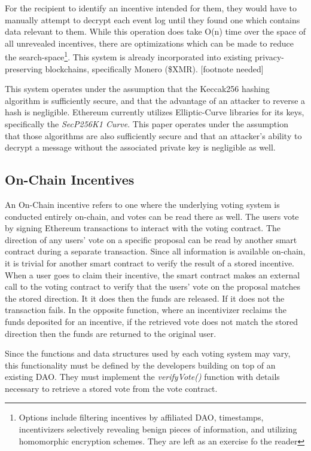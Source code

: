 \documentclass{article}
\begin{document}
For the recipient to identify an incentive intended for them, they would have to manually attempt to decrypt each event log until they found one which contains data relevant to them. While this operation does take O(n) time over the space of all unrevealed incentives, there are optimizations which can be made to reduce the search-space\footnote{Options include filtering incentives by affiliated DAO, timestamps, incentivizers selectively revealing benign pieces of information, and utilizing homomorphic encryption schemes. They are left as an exercise fo the reader}. This system is already incorporated into existing privacy-preserving blockchains, specifically Monero (\$XMR). [footnote needed]

This system operates under the assumption that the Keccak256 hashing algorithm is sufficiently secure, and that the advantage of an attacker to reverse a hash is negligible. Ethereum currently utilizes Elliptic-Curve libraries for its keys, specifically the \emph{SecP256K1 Curve}. This paper operates under the assumption that those algorithms are also sufficiently secure and that an attacker's ability to decrypt a message without the associated private key is negligible as well.

\subsection{On-Chain Incentives}

An On-Chain incentive refers to one where the underlying voting system is conducted entirely on-chain, and votes can be read there as well. The users vote by signing Ethereum transactions to interact with the voting contract. The direction of any users' vote on a specific proposal can be read by another smart contract during a separate transaction. Since all information is available on-chain, it is trivial for another smart contract to verify the result of a stored incentive. When a user goes to claim their incentive, the smart contract makes an external call to the voting contract to verify that the users' vote on the proposal matches the stored direction. It it does then the funds are released. If it does not the transaction fails. In the opposite function, where an incentivizer reclaims the funds deposited for an incentive, if the retrieved vote does not match the stored direction then the funds are returned to the original user.

Since the functions and data structures used by each voting system may vary, this functionality must be defined by the developers building on top of an existing DAO. They must implement the \emph{verifyVote()} function with details necessary to retrieve a stored vote from the vote contract. 
\end{document}
